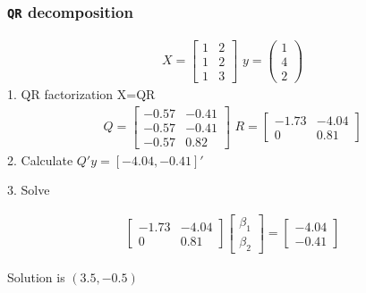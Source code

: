 \documentclass[
  shownotes,
  xcolor={svgnames},
  hyperref={colorlinks,citecolor=DarkBlue,linkcolor=DarkRed,urlcolor=DarkBlue}
  , aspectratio=169]{beamer}
\begin{document}
\begin{frame}[fragile]
\frametitle{\texttt{QR} decomposition}

\footnotesize
\begin{align}
X=\left[\begin{array}{cc}
1 & 2\\
1 & 2\\
1 & 3
\end{array}\right]\,\,
 y=\left(\begin{array}{c}
1\\
4\\
2
\end{array}\right)
\end{align}
1. QR factorization  X=QR
\begin{align}
Q=\left[\begin{array}{cc}
-0.57 & -0.41 \\
-0.57 & -0.41 \\
-0.57 & 0.82
\end{array}\right]\,\,
R=\left[\begin{array}{cc}
-1.73 & -4.04 \\
0 & 0.81 
\end{array}\right]
\end{align}
2. Calculate $Q'y=[-4.04,-0.41]'$

3. Solve

\begin{align}
\left[\begin{array}{cc}
-1.73 & -4.04 \\
0 & 0.81 
\end{array}\right]\left[\begin{array}{c}
\beta_1 \\
\beta_2 
\end{array}\right]=\left[\begin{array}{c}
-4.04 \\
-0.41
\end{array}\right]
\end{align}

Solution is $(3.5, -0.5)$
\end{frame}
\end{document}
